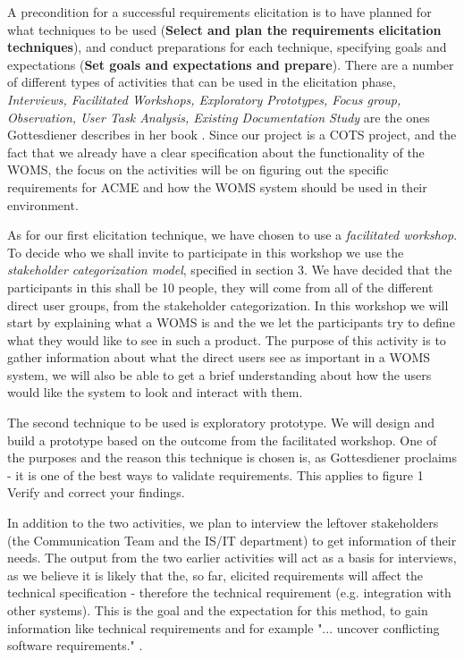 \documentclass[a4paper]{article}
\begin{document}
A precondition for a successful requirements elicitation is to have planned for what techniques to be used (\textbf{Select and plan the requirements elicitation techniques}), and conduct preparations for each technique, specifying goals and expectations (\textbf{Set goals and expectations and prepare}). There are a number of different types of activities that can be used in the elicitation phase, \emph{Interviews, Facilitated Workshops, Exploratory Prototypes, Focus group, Observation, User Task Analysis, Existing Documentation Study} are the ones Gottesdiener describes in her book \cite{gott3}. Since our project is a COTS project, and the fact that we already have a clear specification about the functionality of the WOMS, the focus on the activities will be on figuring out the specific requirements for ACME and how the WOMS system should be used in their environment.

As for our first elicitation technique, we have chosen to use a \emph{facilitated workshop}. To decide who we shall invite to participate in this workshop we use the \emph{stakeholder categorization model}, specified in section 3. We have decided that the participants in this shall be 10 people, they will come from all of the different direct user groups, from the stakeholder categorization. In this workshop we will start by explaining what a WOMS is and the we let the participants try to define what they would like to see in such a product. The purpose of this activity is to gather information about what the direct users see as important in a WOMS system, we will also be able to get a brief understanding about how the users would like the system to look and interact with them.

The second technique to be used is exploratory prototype. We will design and build a prototype based on the outcome from the facilitated workshop. One of the purposes and the reason this technique is chosen is, as Gottesdiener proclaims \cite{gott3} - it is one of the best ways to validate requirements. This applies to figure 1 Verify and correct your findings. 

In addition to the two activities, we plan to interview the leftover stakeholders (the Communication Team and the IS/IT department) to get information of their needs. The output from the two earlier activities will act as a basis for interviews, as we believe it is likely that the, so far, elicited requirements will affect the technical specification - therefore the technical requirement (e.g. integration with other systems). This is the goal and the expectation for this method, to gain information like technical requirements and for example "... uncover conflicting software requirements." \cite{gott3}.
\end{document}
